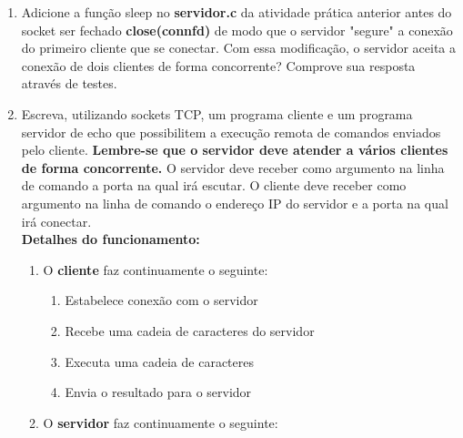 \documentclass[12pt,a4paper]{report}
\begin{document}
\begin{enumerate}
    \item Adicione a função sleep no \textbf{servidor.c} da atividade prática anterior antes do socket ser fechado \textbf{close(connfd)} de modo que o servidor "segure" a conexão do primeiro cliente que se conectar. Com essa modificação, o servidor aceita a conexão de dois clientes de forma concorrente? Comprove sua resposta através de testes.
    
    \item Escreva, utilizando sockets TCP, um programa cliente e um programa servidor de echo que possibilitem a execução remota de comandos enviados pelo cliente. \textbf{Lembre-se que o servidor deve atender a vários clientes de forma concorrente.} O servidor deve receber como argumento na linha de comando a porta na qual irá escutar. O cliente deve receber como argumento na linha de comando o endereço IP do servidor e a porta na qual irá conectar.
    \\
    \textbf{Detalhes do funcionamento:}
    \begin{enumerate}
        \item O \textbf{cliente} faz continuamente o seguinte:
        
        \begin{enumerate}
            \item Estabelece conexão com o servidor
            \item Recebe uma cadeia de caracteres do servidor
            \item Executa uma cadeia de caracteres
            \item Envia o resultado para o servidor
        \end{enumerate}
        
        \item O \textbf{servidor} faz continuamente o seguinte:
        

\end{enumerate}
\end{enumerate}
\end{document}
